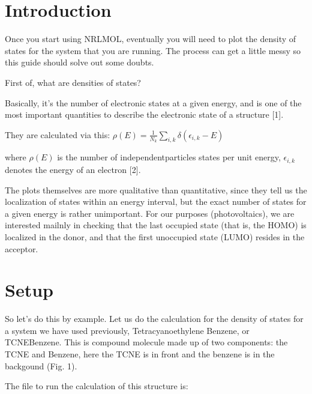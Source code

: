\documentclass[letterpaper,10pt,english,openany,oneside]{sphinxmanual}
\begin{document}
\section{Introduction}
\label{\detokenize{tutorials/ddos/density_of_states:introduction}}
\sphinxAtStartPar
Once you start using NRLMOL, eventually you will need to plot the density of states for the system that you are running. The process can get a little messy so this guide should solve out some doubts.

\sphinxAtStartPar
First of, what are densities of states?

\sphinxAtStartPar
Basically, it’s the number of electronic states at a given energy, and is one of the most important quantities to describe the electronic state of a structure {[}1{]}.

\sphinxAtStartPar
They are calculated via this:
\(\rho(E)=\frac{1}{N_k}\sum\limits_{i,k}\delta(\epsilon_{i,k}-E)\)

\sphinxAtStartPar
where \(\rho(E)\) is the number of independent\sphinxhyphen{}particles states per unit energy, \(\epsilon_{i,k}\) denotes the energy of an electron {[}2{]}.

\sphinxAtStartPar
The plots themselves are more qualitative than quantitative, since they tell us the localization of states within an energy interval, but the exact number of states for a given energy is rather unimportant. For our purposes (photovoltaics), we are interested mailnly in checking that the last occupied state (that is, the HOMO) is localized in the donor, and that the first unoccupied state (LUMO) resides in the acceptor.


\section{Setup}
\label{\detokenize{tutorials/ddos/density_of_states:setup}}
\sphinxAtStartPar
So let’s do this by example. Let us do the calculation for the density of states for a system we have used previously, Tetracyanoethylene Benzene, or TCNE\sphinxhyphen{}Benzene. This is compound molecule made up of two components: the TCNE and Benzene, here the TCNE is in front and the benzene is in the backgound (Fig. 1).

\begin{figure}[htbp]
\centering

\noindent{}
\end{figure}

\sphinxAtStartPar
The  file to run the calculation of this structure is:
\end{document}
